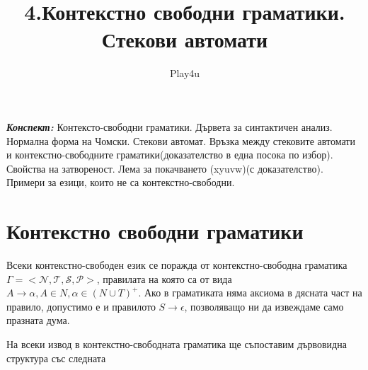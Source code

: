 \documentclass[11pt]{article} %
\title{4.Контекстно свободни граматики. Стекови автомати}
\author{Play4u}
\begin{document}
\maketitle

\newcommand{\lrangle}[1]{\left\langle #1 \right\rangle}

\newcommand{\belongsTo}{\in}
\newcommand{\notBelongsTo}{\centernot\in}

\newcommand{\oversetModels}[1]{\overset{#1}{\models}}

\newcommand{\kda}{A = <Q, X, q_{0}, \delta, F>}
\newcommand{\cfg}{\Gamma = <\mathcal{N}, \mathcal{T}, \mathcal{S}, \mathcal{P}>}
\newcommand{\cfgVers}{G = \langle V, \Sigma, R, S \rangle}
\newcommand{\nsa}{A = <Q, X, Z, q_{0}, z_{0}, \delta, F>}

\newcommand{\italicBold}[1]{\textbf{\emph{#1}}}
\newcommand{\definition}{\italicBold{Дефиниция: }}
\newcommand{\theorem}{\italicBold{Теорема: }}
\newcommand{\lemma}{\italicBold{Лема: }}
\newcommand{\proof}{\italicBold{Доказателство: }}

\newcommand{\curlies}[1]{\{#1\}}

\newcommand{\enumNum}{\renewcommand{\theenumi}{\arabic{enumi}}}
\newcommand{\enumlet}{\renewcommand{\theenumi}{\alph{enumi}}}

\italicBold{Конспект:} Контексто-свободни граматики. Дървета за синтактичен анализ. Нормална форма на Чомски. Стекови автомат. Връзка между стековите автомати и контекстно-свободните граматики(доказателство в една посока по избор). Свойства на затвореност. Лема за покачването (xyuvw)(с доказателство). Примери за езици, които не са контекстно-свободни.

\section{Контекстно свободни граматики}
Всеки контекстно-свободен език се поражда от контекстно-свободна граматика $\cfg$, правилата на която са от вида $A \to \alpha, A \in N, \alpha \in (N \cup T)^{+}$.
Ако в граматиката няма аксиома в дясната част на правило, допустимо е и правилото $S \to \epsilon$, позволяващо ни да извеждаме само празната дума. \par

На всеки извод в контекстно-свободната граматика ще  съпоставим дървовидна структура със следната 
\end{document}
